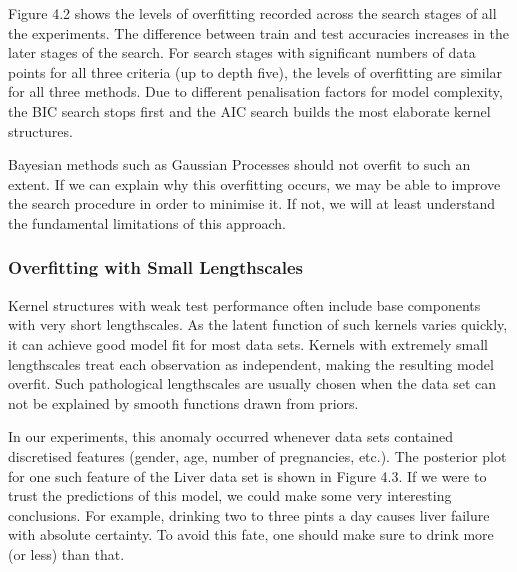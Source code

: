 \documentclass[a4paper,12pt ]{report}
\begin{document}
Figure 4.2 shows the levels of overfitting recorded across the search stages of all the experiments. The difference between train and test accuracies increases in the later stages of the search. For search stages with significant numbers of data points for all three criteria (up to depth five), the levels of overfitting are similar for all three methods. Due to different penalisation factors for model complexity, the BIC search stops first and the AIC search builds the most elaborate kernel structures.

Bayesian methods such as Gaussian Processes should not overfit to such an extent. If we can explain why this overfitting occurs, we may be able to improve the search procedure in order to minimise it. If not, we will at least understand the fundamental limitations of this approach.




\subsubsection*{Overfitting with Small Lengthscales}

Kernel structures with weak test performance often include base components with very short lengthscales. As the latent function of such kernels varies quickly, it can achieve good model fit for most data sets. Kernels with extremely small lengthscales treat each observation as independent, making the resulting model overfit. Such pathological lengthscales are usually chosen when the data set can not be explained by smooth functions drawn from {\SE} priors.

In our experiments, this anomaly occurred whenever data sets contained discretised features (gender, age, number of pregnancies, etc.). The posterior plot for one such feature of the Liver data set is shown in Figure 4.3. If we were to trust the predictions of this model, we could make some very interesting conclusions. For example, drinking two to three pints a day causes liver failure with absolute certainty. To avoid this fate, one should make sure to drink more (or less) than that. \\

\end{document}
